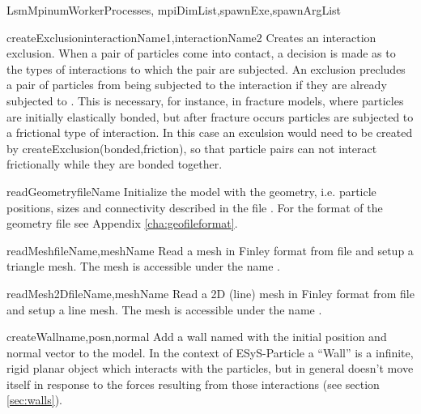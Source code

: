 \documentclass{manual}
\begin{document}
\begin{classdesc}{LsmMpi}{numWorkerProcesses, mpiDimList,spawnExe,spawnArgList}
\begin{methoddesc}{createExclusion}{interactionName1,interactionName2}
Creates an interaction exclusion. When a pair of particles come into contact, a decision is made as to the types of interactions to which the pair are subjected. An exclusion precludes a pair of particles from being subjected to the interaction  if they are already subjected to . This is necessary, for instance, in fracture models, where particles are initially elastically bonded, but after fracture occurs particles are subjected to a frictional type of interaction. In this case an exculsion would need to be created by create{\sf Exclusion(bonded,friction)}, so that particle pairs can not interact frictionally while they are bonded together.

\end{methoddesc}

\begin{methoddesc}{readGeometry}{fileName}
Initialize the model with the geometry, i.e. particle positions, sizes and connectivity described in the file . For the format of the geometry file see Appendix \ref{cha:geofileformat}.
\end{methoddesc}


\begin{methoddesc}{readMesh}{fileName,meshName}
Read a mesh in Finley format from file  and setup a triangle mesh. The mesh is accessible under the name .
\end{methoddesc}

\begin{methoddesc}{readMesh2D}{fileName,meshName}
Read a 2D (line) mesh in Finley format from file  and setup a line mesh. The mesh is accessible under the name .
\end{methoddesc}

\begin{methoddesc}{createWall}{name,posn,normal}
Add a wall named  with the initial position  and normal vector  to the model. In the context of ESyS-Particle a ``Wall'' is a infinite, rigid planar object which interacts with the particles, but in general doesn't move itself in response to the forces resulting from those interactions (see section \ref{sec:walls}). 
\end{methoddesc}


\end{classdesc}
\end{document}
